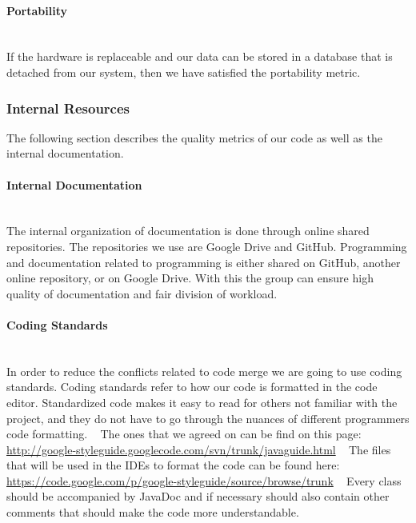\documentclass[../document.tex]{subfiles}
\begin{document}
\paragraph{Portability} \ \\
If the hardware is replaceable and our data can be stored in a database that is detached from our system, then we have satisfied the portability metric.

\subsubsection{Internal Resources}
The following section describes the quality metrics of our code as well as the internal documentation.

\paragraph{Internal Documentation} \ \\
The internal organization of documentation is done through online shared repositories. The repositories we use are Google Drive and GitHub. Programming and documentation related to programming is either shared on GitHub, another online repository, or on Google Drive. With this the group can ensure high quality of documentation and fair division of workload.

\paragraph{Coding Standards} \ \\
In order to reduce the conflicts related to code merge we are going to use coding standards. Coding standards refer to how our code is formatted in the code editor. Standardized code makes it easy to read for others not familiar with the project, and they do not have to go through the nuances of different programmers code formatting.
\newline \ \newline
The ones that we agreed on can be find on this page: \newline
\url{http://google-styleguide.googlecode.com/svn/trunk/javaguide.html}
\newline \ \newline
The files that will be used in the IDEs to format the code can be found here: \newline
\url{https://code.google.com/p/google-styleguide/source/browse/trunk}
\newline \ \newline
Every class should be accompanied by JavaDoc and if necessary should also contain other comments that should make the code more understandable. 
\end{document}
